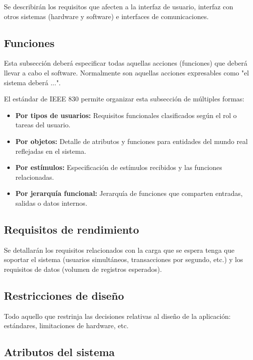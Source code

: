 \documentclass[12pt,a4paper]{article}
\begin{document}
Se describirán los requisitos que afecten a la interfaz de usuario, interfaz con otros sistemas (hardware y software) e interfaces de comunicaciones.

\subsection{Funciones}
\label{sec:funciones_especificas}

Esta subsección deberá especificar todas aquellas acciones (funciones) que deberá llevar a cabo el software. Normalmente son aquellas acciones expresables como "el sistema deberá ...".

El estándar de IEEE 830 permite organizar esta subsección de múltiples formas:
\begin{itemize}
    \item \textbf{Por tipos de usuarios:} Requisitos funcionales clasificados según el rol o tareas del usuario.
    \item \textbf{Por objetos:} Detalle de atributos y funciones para entidades del mundo real reflejadas en el sistema.
    \item \textbf{Por estímulos:} Especificación de estímulos recibidos y las funciones relacionadas.
    \item \textbf{Por jerarquía funcional:} Jerarquía de funciones que comparten entradas, salidas o datos internos.
\end{itemize}

\subsection{Requisitos de rendimiento}
\label{sec:rendimiento}

Se detallarán los requisitos relacionados con la carga que se espera tenga que soportar el sistema (usuarios simultáneos, transacciones por segundo, etc.) y los requisitos de datos (volumen de registros esperados).

\subsection{Restricciones de diseño}
\label{sec:restricciones_diseno}

Todo aquello que restrinja las decisiones relativas al diseño de la aplicación: estándares, limitaciones de hardware, etc.

\subsection{Atributos del sistema}
\label{sec:atributos_sistema}
\end{document}
